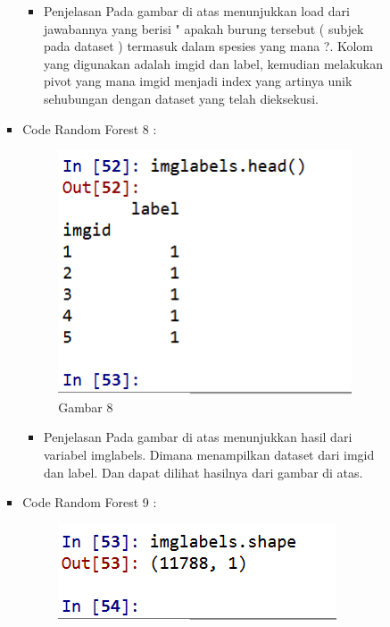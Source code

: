 \begin{enumerate}
\begin{itemize}
\begin{itemize}
\begin{itemize}
\par
\begin{itemize}
\item Penjelasan  Pada gambar di atas menunjukkan load dari  jawabannya yang berisi " apakah burung tersebut ( subjek pada dataset ) termasuk dalam spesies yang mana ?. Kolom yang digunakan adalah imgid dan label, kemudian melakukan pivot yang mana imgid menjadi index yang artinya unik sehubungan dengan dataset yang telah dieksekusi.
\par
\par
\end{itemize}
\item Code Random Forest 8 :
\par
\begin{figure}[ht]
\centering
\includegraphics[scale=0.2]{figures/andi/RF8.PNG}
\caption{Gambar 8}
\label{contoh}
\end{figure}
\par
\begin{itemize}
\item Penjelasan  Pada gambar di atas menunjukkan hasil dari variabel imglabels. Dimana menampilkan dataset dari imgid dan label. Dan dapat dilihat hasilnya dari gambar di atas.
\par
\par
\end{itemize}
\item Code Random Forest 9 :
\par
\begin{figure}[ht]
\centering
\includegraphics[scale=0.7]{figures/andi/RF9.PNG}

\end{figure}
\end{itemize}
\end{itemize}
\end{itemize}
\end{enumerate}
